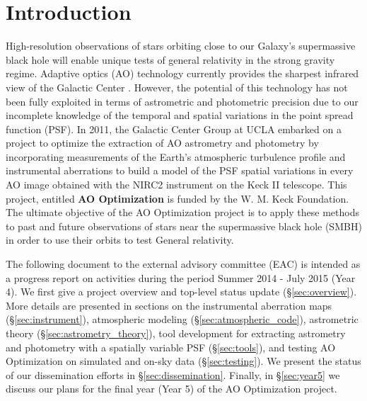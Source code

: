 \section{Introduction}

High-resolution observations of stars orbiting close to our Galaxy's supermassive black hole will enable unique tests of general relativity in the strong gravity regime. Adaptive optics (AO) technology currently provides the sharpest infrared view of the Galactic Center \cite{Ghez_2005}. However, the potential of this technology has not been fully exploited in terms of astrometric and photometric precision due to our incomplete knowledge of the temporal and spatial variations in the point spread function (PSF). In 2011, the Galactic Center Group at UCLA embarked on a project to optimize the extraction of AO astrometry and photometry by incorporating measurements of the Earth's atmospheric turbulence profile and instrumental aberrations to build a model of the PSF spatial variations in every AO image obtained with the NIRC2 instrument on the Keck II telescope. This project, entitled \textbf{AO Optimization} is funded by the W. M. Keck Foundation. The ultimate objective of the AO Optimization project is to apply these methods to past and future observations of stars near the supermassive black hole (SMBH) in order to use their orbits to test General relativity. 

The following document to the external advisory committee (EAC) is intended as a progress report on activities during the period Summer 2014 - July 2015 (Year 4). We first give a project overview and top-level status update (\S\ref{sec:overview}). More details are presented in sections on the instrumental aberration maps (\S\ref{sec:instrument}), atmospheric modeling (\S\ref{sec:atmospheric_code}), astrometric theory (\S\ref{sec:astrometry_theory}), tool development for extracting astrometry and photometry with a spatially variable PSF (\S\ref{sec:tools}), and testing AO Optimization on simulated and on-sky data (\S\ref{sec:testing}). We present the status of our dissemination efforts in \S\ref{sec:dissemination}. Finally, in \S\ref{sec:year5} we discuss our plans for the final year (Year 5) of the AO Optimization project.



  
  